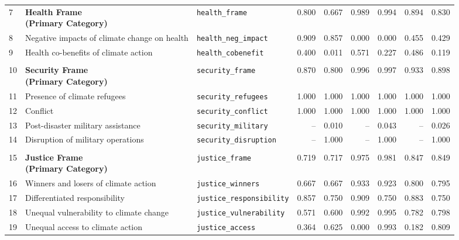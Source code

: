 \begin{longtable}{p{0.4cm}p{4.0cm}p{3.0cm}rrrrrr}
\midrule
\rowcolor{gray!8}
\multicolumn{9}{l}{\textit{Health Frame}} \\
\midrule
7 & \textbf{Health Frame\newline (Primary Category)} & \texttt{health\_frame} & 0.800 & 0.667 & 0.989 & 0.994 & 0.894 & 0.830 \\
\cmidrule(lr){1-9}
8 & Negative impacts of climate change on health & \texttt{health\_neg\_impact} & 0.909 & 0.857 & 0.000 & 0.000 & 0.455 & 0.429 \\
9 & Health co-benefits of climate action & \texttt{health\_cobenefit} & 0.400 & 0.011 & 0.571 & 0.227 & 0.486 & 0.119 \\
\midrule
\rowcolor{gray!8}
\multicolumn{9}{l}{\textit{Security Frame}} \\
\midrule
10 & \textbf{Security Frame\newline (Primary Category)} & \texttt{security\_frame} & 0.870 & 0.800 & 0.996 & 0.997 & 0.933 & 0.898 \\
\cmidrule(lr){1-9}
11 & Presence of climate refugees & \texttt{security\_refugees} & 1.000 & 1.000 & 1.000 & 1.000 & 1.000 & 1.000 \\
12 & Conflict & \texttt{security\_conflict} & 1.000 & 1.000 & 1.000 & 1.000 & 1.000 & 1.000 \\
13 & Post-disaster military assistance & \texttt{security\_military} & -- & 0.010 & -- & 0.043 & -- & 0.026 \\
14 & Disruption of military operations & \texttt{security\_disruption} & -- & 1.000 & -- & 1.000 & -- & 1.000 \\
\midrule
\rowcolor{gray!8}
\multicolumn{9}{l}{\textit{Justice Frame}} \\
\midrule
15 & \textbf{Justice Frame\newline (Primary Category)} & \texttt{justice\_frame} & 0.719 & 0.717 & 0.975 & 0.981 & 0.847 & 0.849 \\
\cmidrule(lr){1-9}
16 & Winners and losers of climate action & \texttt{justice\_winners} & 0.667 & 0.667 & 0.933 & 0.923 & 0.800 & 0.795 \\
17 & Differentiated responsibility & \texttt{justice\_responsibility} & 0.857 & 0.750 & 0.909 & 0.750 & 0.883 & 0.750 \\
18 & Unequal vulnerability to climate change & \texttt{justice\_vulnerability} & 0.571 & 0.600 & 0.992 & 0.995 & 0.782 & 0.798 \\
19 & Unequal access to climate action & \texttt{justice\_access} & 0.364 & 0.625 & 0.000 & 0.993 & 0.182 & 0.809 \\

\end{longtable}
